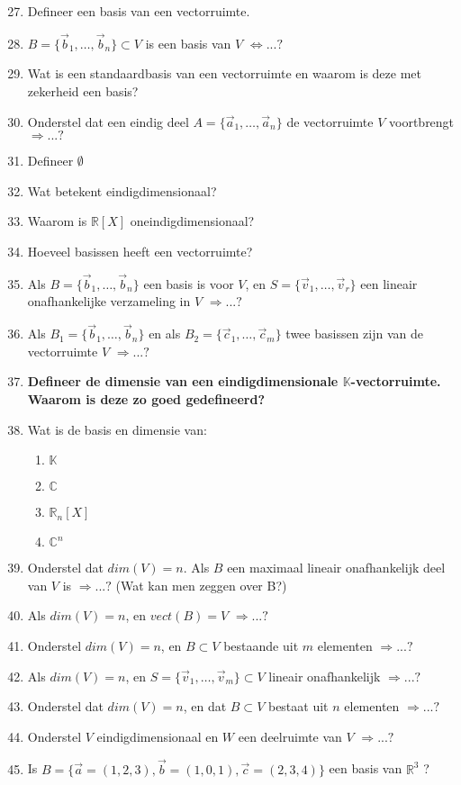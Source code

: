 \documentclass[12pt]{article}
\begin{document}
    \begin{enumerate}
        \setcounter{enumi}{26}
        \item Defineer een basis van een vectorruimte.
        \item $B=\{\vec{b}_1,\dots,\vec{b}_n\}\subset V$ is een basis van $V$ $\Leftrightarrow ...?$
        \item Wat is een standaardbasis van een vectorruimte en waarom is deze met zekerheid een basis?
        \item Onderstel dat een eindig deel $A= \{\vec{a}_1,\dots,\vec{a}_n\}$ de vectorruimte $V$ voortbrengt $\Rightarrow ...?$
        \item Defineer $\emptyset$
        \item Wat betekent eindigdimensionaal?
        \item Waarom is $\mathbb{R}[X]$ oneindigdimensionaal?
        \item Hoeveel basissen heeft een vectorruimte?
        \item Als $B=\{\vec{b}_1,\dots,\vec{b}_n\}$ een basis is voor $V$, en $S= \{\vec{v}_1,\dots,\vec{v}_r\}$ een lineair onafhankelijke verzameling in $V$ $\Rightarrow ...?$
        \item Als $B_1=\{\vec{b}_1,\dots,\vec{b}_n\}$ en als $B_2=\{\vec{c}_1,\dots,\vec{c}_m\}$ twee basissen zijn van de vectorruimte $V$ $\Rightarrow ...?$
        \item \textbf{Defineer de dimensie van een eindigdimensionale $\mathbb{K}$-vectorruimte. Waarom is deze zo goed gedefineerd?}
        \item Wat is de basis en dimensie van: \begin{enumerate}
            \item $\mathbb{K}$
            \item $\mathbb{C}$
            \item $\mathbb{R}_n[X]$
            \item $\mathbb{C}^n$
        \end{enumerate}
        \item Onderstel dat $dim(V)=n$. Als $B$ een maximaal lineair onafhankelijk deel van $V$ is $\Rightarrow ...?$ (Wat kan men zeggen over B?)
        \item Als $dim(V)=n$, en $vect(B)=V$ $\Rightarrow ...?$
        \item Onderstel $dim(V)=n$, en $B \subset V$ bestaande uit $m$ elementen $\Rightarrow ...?$
        \item Als $dim(V)=n$, en $S= \{\vec{v}_1,\dots,\vec{v}_m\}\subset V$ lineair onafhankelijk $\Rightarrow ...?$
        \item Onderstel dat $dim(V)=n$, en dat $B \subset V$ bestaat uit $n$ elementen $\Rightarrow ...?$
        \item Onderstel $V$ eindigdimensionaal en $W$ een deelruimte van $V$ $\Rightarrow ...?$
        \item Is $B=\{\vec{a}=(1,2,3), \vec{b}=(1,0,1), \vec{c}=(2,3,4)\}$ een basis van $\mathbb{R}^3$ ?
    \end{enumerate}
\end{document}
